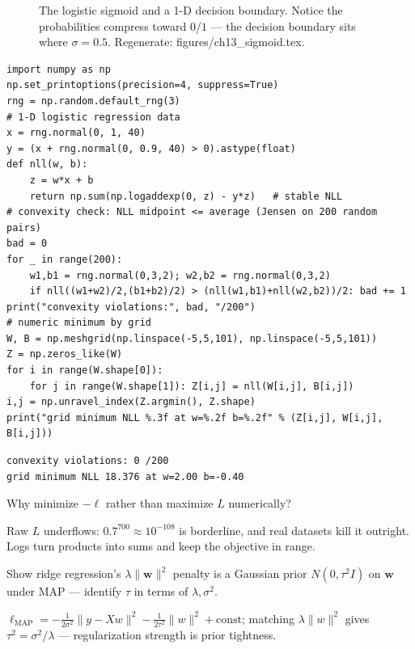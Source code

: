 \begin{figure}[htbp]
\centering

\caption{The logistic sigmoid and a 1-D decision boundary. Notice the
probabilities compress toward $0$/$1$ --- the decision boundary sits
where $\sigma=0.5$. Regenerate: \ttfamily figures/ch13\_sigmoid.tex.}
\label{fig:sigmoid}
\end{figure}

\begin{lstlisting}[caption={\ttfamily code/ch13\_logistic\_nll.py ---
the logistic NLL convexity-checked and grid-minimized: tomorrow's loss
landscape, today.}]
import numpy as np
np.set_printoptions(precision=4, suppress=True)
rng = np.random.default_rng(3)
# 1-D logistic regression data
x = rng.normal(0, 1, 40)
y = (x + rng.normal(0, 0.9, 40) > 0).astype(float)
def nll(w, b):
    z = w*x + b
    return np.sum(np.logaddexp(0, z) - y*z)   # stable NLL
# convexity check: NLL midpoint <= average (Jensen on 200 random pairs)
bad = 0
for _ in range(200):
    w1,b1 = rng.normal(0,3,2); w2,b2 = rng.normal(0,3,2)
    if nll((w1+w2)/2,(b1+b2)/2) > (nll(w1,b1)+nll(w2,b2))/2: bad += 1
print("convexity violations:", bad, "/200")
# numeric minimum by grid
W, B = np.meshgrid(np.linspace(-5,5,101), np.linspace(-5,5,101))
Z = np.zeros_like(W)
for i in range(W.shape[0]):
    for j in range(W.shape[1]): Z[i,j] = nll(W[i,j], B[i,j])
i,j = np.unravel_index(Z.argmin(), Z.shape)
print("grid minimum NLL %.3f at w=%.2f b=%.2f" % (Z[i,j], W[i,j], B[i,j]))
\end{lstlisting}

\begin{lstlisting}[caption={Output of the logistic experiment. Notice
0/200 Jensen violations --- the NLL surface is empirically convex, which
is why gradient descent will work on it in chapter 14.}]
convexity violations: 0 /200
grid minimum NLL 18.376 at w=2.00 b=-0.40
\end{lstlisting}

\begin{exercise}[easy]
Why minimize $-\ell$ rather than maximize $L$ numerically?
\begin{solution}
Raw $L$ underflows: $0.7^{700}\approx10^{-108}$ is borderline, and real
datasets kill it outright. Logs turn products into sums and keep the
objective in range.
\end{solution}
\end{exercise}

\begin{exercise}[hard]
Show ridge regression's $\lambda\lVert\mathbf w\rVert^{2}$ penalty is a
Gaussian prior $N(0,\tau^{2}I)$ on $\mathbf w$ under MAP --- identify
$\tau$ in terms of $\lambda,\sigma^{2}$.
\begin{solution}
$\ell_{\mathrm{MAP}}=-\frac{1}{2\sigma^2}\lVert y-Xw\rVert^2
-\frac{1}{2\tau^2}\lVert w\rVert^2+\mathrm{const}$; matching
$\lambda\lVert w\rVert^2$ gives $\tau^2=\sigma^2/\lambda$ ---
regularization strength is prior tightness.
\end{solution}
\end{exercise}


